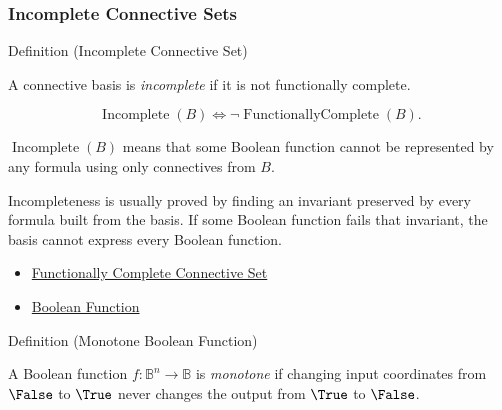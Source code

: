 \subsubsection*{Incomplete Connective Sets}

\begin{definitionbox}{Definition (Incomplete Connective Set)}
\begin{definition}
\label{def:incomplete-connective-set-propositional-logic}
A connective basis is \emph{incomplete} if it is not functionally complete.
\end{definition}
\end{definitionbox}

\begin{remark*}
\[
\operatorname{Incomplete}(B)
\Longleftrightarrow
\neg\operatorname{FunctionallyComplete}(B).
\]
\end{remark*}

\begin{remark*}
\(\operatorname{Incomplete}(B)\) means that some Boolean function cannot be
represented by any formula using only connectives from \(B\).
\end{remark*}

\begin{remark*}[Interpretation]
Incompleteness is usually proved by finding an invariant preserved by every
formula built from the basis. If some Boolean function fails that invariant, the
basis cannot express every Boolean function.
\end{remark*}

\begin{dependencies}
\begin{itemize}
  \item \hyperref[def:functionally-complete-connective-set-propositional-logic]{Functionally Complete Connective Set}
  \item \hyperref[def:boolean-function-propositional-logic]{Boolean Function}
\end{itemize}
\end{dependencies}

\begin{definitionbox}{Definition (Monotone Boolean Function)}
\begin{definition}
\label{def:monotone-boolean-function-propositional-logic}
A Boolean function \(f:\mathbb{B}^n\to\mathbb{B}\) is \emph{monotone} if
changing input coordinates from \(\False\) to \(\True\) never changes the output
from \(\True\) to \(\False\).
\end{definition}
\end{definitionbox}

